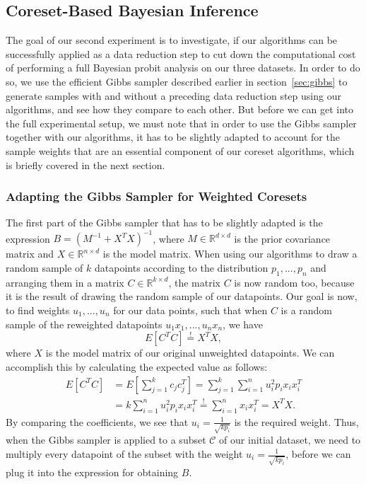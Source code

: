 \subsection{Coreset-Based Bayesian Inference}

The goal of our second experiment is to investigate, if our
algorithms can be successfully applied as a data reduction
step to cut down the computational cost of performing
a full Bayesian probit analysis on our three datasets.
In order to do so, we use the efficient Gibbs sampler
described earlier in section~\ref{sec:gibbs} to generate
samples with and without a preceding data reduction step using
our algorithms, and see how they compare to each other.
But before we can get into the full experimental setup,
we must note that in order to use the Gibbs sampler together
with our algorithms, it has to be slightly adapted
to account for the sample weights that are an
essential component of our coreset algorithms,
which is briefly covered in the next section.

\subsubsection{Adapting the Gibbs Sampler for Weighted Coresets}
\label{sec:gibbs-adaptation}

The first part of the Gibbs sampler that has to be slightly adapted
is the expression $B = (M^{-1} + X^TX)^{-1}$, where
$M \in \mathbb{R}^{d \times d}$
is the prior covariance matrix and
$X \in \mathbb{R}^{n \times d}$ is the model matrix.
When using our algorithms to draw a random sample of $k$
datapoints according to the distribution $p_1, ..., p_n$
and arranging them in a matrix $C \in \mathbb{R}^{k \times d}$,
the matrix $C$ is now random too, because it is the result of
drawing the random sample of our datapoints.
Our goal is now, to find weights $u_1, ..., u_n$ for our
data points, such that when $C$ is a random sample of the
reweighted datapoints $u_1x_1, ..., u_nx_n$, we have
\begin{equation*}
    E[C^TC] \overset{!}{=} X^TX,
\end{equation*}
where $X$ is the model matrix of our original unweighted datapoints.
We can accomplish this by calculating the expected value as follows:
\begin{align*}
    E[C^TC] & = E\left[\sum_{j=1}^k c_jc_j^T\right]
    = \sum_{j=1}^k \sum_{i=1}^n u_i^2 p_i x_i x_i^T \\
            & = k\sum_{i=1}^n u_i^2 p_i x_i x_i^T
    \overset{!}{=} \sum_{i=1}^n x_i x_i^T = X^TX.
\end{align*}
By comparing the coefficients, we see that
$u_i = \frac{1}{\sqrt{k p_i}}$ is the required weight.
Thus, when the Gibbs sampler is applied to a subset
$\mathcal{C}$ of our initial dataset, we need to multiply every
datapoint of the subset with the weight
$u_i = \frac{1}{\sqrt{k p_i}}$, before we can plug it into
the expression for obtaining $B$.

